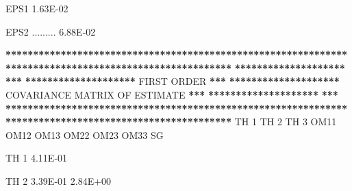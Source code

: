 \documentclass[
  11pt,
  krantz2,
  a4paper]{krantz}
\newenvironment{Shaded}{\begin{snugshade}}{\end{snugshade}}
\newcommand{\DecValTok}[1]{\textcolor[rgb]{0.00,0.00,0.81}{#1}}
\newcommand{\ErrorTok}[1]{\textcolor[rgb]{0.64,0.00,0.00}{\textbf{#1}}}
\newcommand{\FloatTok}[1]{\textcolor[rgb]{0.00,0.00,0.81}{#1}}
\newcommand{\NormalTok}[1]{#1}
\newcommand{\OperatorTok}[1]{\textcolor[rgb]{0.81,0.36,0.00}{\textbf{#1}}}
\newcommand{\StringTok}[1]{\textcolor[rgb]{0.31,0.60,0.02}{#1}}
\theoremstyle{definition}
\theoremstyle{definition}
\theoremstyle{definition}
\theoremstyle{remark}
\begin{document}
\begin{Shaded}
\begin{Highlighting}[]
\NormalTok{EPS1    }\FloatTok{1.63E{-}02}                                                                                       
                                                                                                       
\NormalTok{EPS2   .........  }\FloatTok{6.88E{-}02}                                                                             
                                                                                                       
                                                                                                       
\OperatorTok{**}\ErrorTok{*****************************************************************************************************}
\ErrorTok{********************}\StringTok{                                                                                }\ErrorTok{***}
\ErrorTok{********************}\StringTok{                                   }\NormalTok{FIRST ORDER                                  }\OperatorTok{**}\ErrorTok{*}
\ErrorTok{********************}\StringTok{                          }\NormalTok{COVARIANCE MATRIX OF ESTIMATE                         }\OperatorTok{**}\ErrorTok{*}
\ErrorTok{********************}\StringTok{                                                                                }\ErrorTok{***}
\ErrorTok{*******************************************************************************************************}
\StringTok{                                                                                                       }
\StringTok{                                                                                                       }
\StringTok{           }\NormalTok{TH }\DecValTok{1}\NormalTok{      TH }\DecValTok{2}\NormalTok{      TH }\DecValTok{3}\NormalTok{      OM11      OM12      OM13      OM22      OM23      OM33      SG}
                                                                                                       
                                                                                                       
\NormalTok{TH }\DecValTok{1}    \FloatTok{4.11E{-}01}                                                                                       
                                                                                                       
\NormalTok{TH }\DecValTok{2}    \FloatTok{3.39E{-}01}  \FloatTok{2.84E+00}                                                                             
                                                                                                       

\end{Highlighting}
\end{Shaded}
\end{document}
